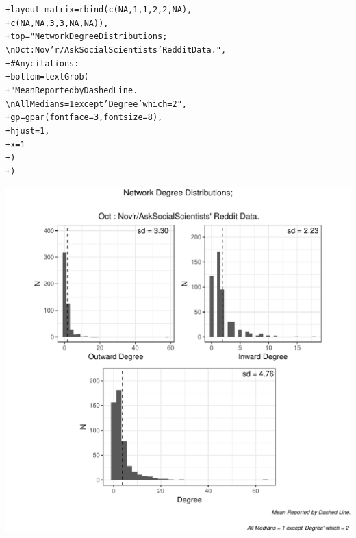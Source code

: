 \documentclass[12pt]{article}\usepackage[]{graphicx}\usepackage[]{color}
\makeatletter
\newcommand{\hlnum}[1]{\textcolor[rgb]{0.82,0.78,0.62}{#1}}%
\newcommand{\hlstr}[1]{\textcolor[rgb]{0.82,0.78,0.62}{#1}}%
\newcommand{\hlcom}[1]{\textcolor[rgb]{0.404,0.408,0.42}{#1}}%
\newcommand{\hlstd}[1]{\textcolor[rgb]{0.882,0.878,0.898}{#1}}%
\newcommand{\hlkwc}[1]{\textcolor[rgb]{0.812,0.522,0.388}{#1}}%
\newcommand{\hlkwd}[1]{\textcolor[rgb]{0.733,0.388,0.812}{#1}}%
\newenvironment{kframe}{%
 \def\at@end@of@kframe{}%
 \ifinner\ifhmode%
  \def\at@end@of@kframe{\end{minipage}}%
  \begin{minipage}{\columnwidth}%
 \fi\fi%
 \def\FrameCommand##1{\hskip\@totalleftmargin \hskip-\fboxsep
 \colorbox{shadecolor}{##1}\hskip-\fboxsep
     \hskip-\linewidth \hskip-\@totalleftmargin \hskip\columnwidth}%
 \MakeFramed {\advance\hsize-\width
   \@totalleftmargin\z@ \linewidth\hsize
   \@setminipage}}%
 {\par\unskip\endMakeFramed%
 \at@end@of@kframe}
\newenvironment{knitrout}{}{} %
\makeatother
\begin{document}
\begin{flushleft}
\begin{center}
\begin{knitrout}
\begin{kframe}
\begin{alltt}
\hlstd{+ }     \hlkwc{layout_matrix} \hlstd{=} \hlkwd{rbind}\hlstd{(}\hlkwd{c}\hlstd{(}\hlnum{NA}\hlstd{,} \hlnum{1}\hlstd{,} \hlnum{1}\hlstd{,} \hlnum{2}\hlstd{,} \hlnum{2}\hlstd{,} \hlnum{NA}\hlstd{),}
\hlstd{+ }                           \hlkwd{c}\hlstd{(}\hlnum{NA}\hlstd{,} \hlnum{NA}\hlstd{,} \hlnum{3}\hlstd{,} \hlnum{3}\hlstd{,} \hlnum{NA}\hlstd{,} \hlnum{NA}\hlstd{)),}
\hlstd{+ }     \hlkwc{top} \hlstd{=} \hlstr{"Network Degree Distributions;
          \textbackslash{}n Oct : Nov'r/AskSocialScientists' Reddit Data."}\hlstd{,}
\hlstd{+ }     \hlcom{# Any citations:}
\hlstd{+ }     \hlkwc{bottom} \hlstd{=} \hlkwd{textGrob}\hlstd{(}
\hlstd{+ }          \hlstr{"Mean Reported by Dashed Line.
          \textbackslash{}n All Medians = 1 except 'Degree' which = 2 "}\hlstd{,}
\hlstd{+ }          \hlkwc{gp} \hlstd{=} \hlkwd{gpar}\hlstd{(}\hlkwc{fontface} \hlstd{=} \hlnum{3}\hlstd{,} \hlkwc{fontsize} \hlstd{=} \hlnum{8}\hlstd{),}
\hlstd{+ }          \hlkwc{hjust} \hlstd{=} \hlnum{1}\hlstd{,}
\hlstd{+ }          \hlkwc{x} \hlstd{=} \hlnum{1}
\hlstd{+ }     \hlstd{)}
\hlstd{+ }\hlstd{)}
\end{alltt}
\end{kframe}
\includegraphics[width=6in]{figure/degree-1} 

\end{knitrout}
\end{center}



\end{flushleft}
\end{document}
